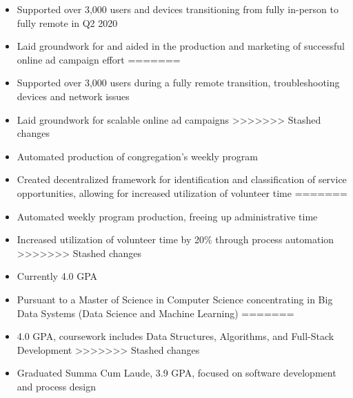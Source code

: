 \par\smallskip
\begin{minipage}{13.75cm}
  \begin{minipage}{6.5cm}
    \begin{itemize}
<<<<<<< Updated upstream
      \item Supported over 3,000 users and devices transitioning
            from fully in-person to fully remote in Q2 2020
      \item Laid groundwork for and aided in the production and
            marketing of successful online ad campaign effort
=======
      \item Supported over 3,000 users during a fully remote transition, troubleshooting devices and network issues
      \item Laid groundwork for scalable online ad campaigns
>>>>>>> Stashed changes
    \end{itemize}
  \end{minipage}
  \hfill
  \begin{minipage}{6.5cm}
    \begin{itemize}
<<<<<<< Updated upstream
      \item Automated production of congregation’s weekly program
      \item Created decentralized framework for identification and
            classification of service opportunities, allowing for
            increased utilization of volunteer time
=======
      \item Automated weekly program production, freeing up administrative time
      \item Increased utilization of volunteer time by 20\% through process automation
>>>>>>> Stashed changes
    \end{itemize}
  \end{minipage}
\end{minipage}

\par\bigskip
{}
\begin{itemize}
<<<<<<< Updated upstream
  \item Currently 4.0 GPA
  \item Pursuant to a Master of Science in Computer Science concentrating in Big Data Systems (Data Science and Machine Learning)
=======
  \item 4.0 GPA, coursework includes Data Structures, Algorithms, and Full-Stack Development
>>>>>>> Stashed changes
\end{itemize}
\divider

\begin{itemize}
  \item Graduated Summa Cum Laude, 3.9 GPA, focused on software development and process design
\end{itemize}

